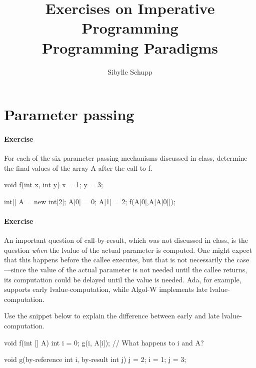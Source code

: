 \documentclass{article}
\newcommand{\percent}[1]{\protect \marginpar[l]{\bf [#1 points]}}
\newcounter{question}
\newenvironment{question}[1]{
  \addtocounter{question}{1}
  \paragraph{Exercise~\arabic{question}  \percent{#1}}
}{
  \vfil
}
\begin{document}
\title{Exercises on Imperative Programming\\
  \large Programming Paradigms}
\author{Sibylle Schupp}
\maketitle


\section{Parameter passing \percent{25}}

\begin{question}{X}{
For each of the six parameter passing mechanisms discussed in class,
determine the final values of the array \textsf{A} after the call
to \textsf{f}. 

\vfil\noindent\begin{minipage}[b]{0.5\linewidth}
\begin{java}
void f(int x, int y) {
    x = 1;
    y = 3;
}
\end{java}%
\end{minipage}%
\begin{minipage}[b]{0.5\linewidth}
\begin{java}
int[] A = new int[2];
A[0] = 0;
A[1] = 2;
f(A[0],A[A[0]]);
\end{java}%
\end{minipage}%
\end{question}

\begin{question}{X}{
An important question of call-by-result, which was not discussed in
class, is the question \textit{when} the lvalue of the actual parameter is 
computed. One might expect that this happens before the callee executes,
but that is not necessarily the case---since the value of the actual
parameter is not needed until the 
callee returns, its computation could be delayed until the value is needed.
Ada, for example,  supports early lvalue-computation, while Algol-W implements
late lvalue-computation.

Use the snippet below to explain the difference between early and late
lvalue-computation.
\vfil\noindent\begin{minipage}[b]{0.45\linewidth}
\begin{java}
void f(int [] A) {
   int i = 0;
   g(i, A[i]);
   // What happens to i and A?
}

\end{java}%
\end{minipage}%
\begin{minipage}[b]{0.55\linewidth}
\begin{java}
void g(by-reference int i, by-result int j) {
   j = 2;
   i = 1;
   j = 3;
}
\end{java}%
\end{minipage}%
\end{question}
\end{document}
